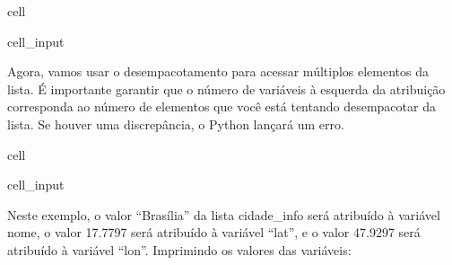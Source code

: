 \documentclass[letterpaper,10pt,english]{jupyterBook}
\begin{document}
\begin{sphinxuseclass}{cell}\begin{sphinxVerbatimInput}

\begin{sphinxuseclass}{cell_input}
\begin{sphinxVerbatim}[commandchars=\\\{\}]
  \PYG{p}{[}  \PYG{p}{]}
\end{sphinxVerbatim}

\end{sphinxuseclass}\end{sphinxVerbatimInput}

\end{sphinxuseclass}
\sphinxAtStartPar
Agora, vamos usar o desempacotamento para acessar múltiplos elementos da lista. É importante garantir que o número de variáveis à esquerda da atribuição corresponda ao número de elementos que você está tentando desempacotar da lista. Se houver uma discrepância, o Python lançará um erro.

\begin{sphinxuseclass}{cell}\begin{sphinxVerbatimInput}

\begin{sphinxuseclass}{cell_input}
\begin{sphinxVerbatim}[commandchars=\\\{\}]
    
\end{sphinxVerbatim}

\end{sphinxuseclass}\end{sphinxVerbatimInput}

\end{sphinxuseclass}
\sphinxAtStartPar
Neste exemplo, o valor “Brasília” da lista cidade\_info será atribuído à variável nome, o valor \sphinxhyphen{}17.7797 será atribuído à variável “lat”, e o valor \sphinxhyphen{}47.9297 será atribuído à variável “lon”.	Imprimindo os valores das variáveis:
\end{document}
